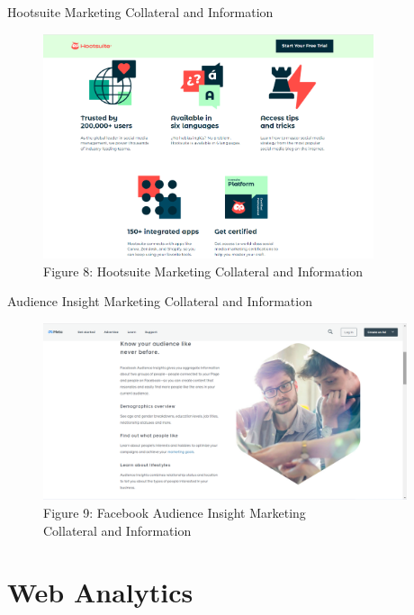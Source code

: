 \documentclass[pdf]{beamer}
\theoremstyle{remark}
\theoremstyle{definition}
\begin{document}
\begin{frame}[t]{Hootsuite Marketing Collateral and Information}
\begin{figure}[htbp]
  \captionsetup{justification=centering}
  \includegraphics[height=6.6cm, trim=0.0cm 0.0cm 0.0cm 0.0cm width=6.6cm]{Images/Hootsuite_SocialMedia_1022_4.png}
  \caption{Figure {\color{franklinblue} 8}: Hootsuite Marketing Collateral and Information}
\end{figure}
\end{frame}

\begin{frame}[t]{Audience Insight Marketing Collateral and Information}
\begin{figure}[htbp]
  \captionsetup{justification=centering}
  \includegraphics[height=5.2cm, trim=0.0cm 0.0cm 0.0cm 0.0cm width=5.2cm]{Images/Facebook_Audience_Insights_120122.png}
  \caption{Figure {\color{franklinblue} 9}: Facebook Audience Insight Marketing \\ Collateral and Information}
\end{figure}
\end{frame}

\section{Web Analytics}
\end{document}
